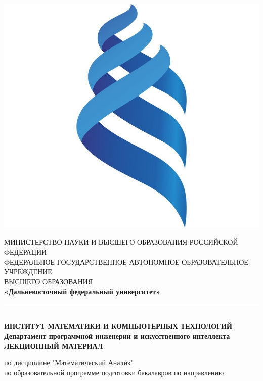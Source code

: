 \documentclass[12pt]{article}
\let\ORIincludegraphics\includegraphics
\renewcommand{\includegraphics}[2][]{\ORIincludegraphics[scale=0.65,#1]{#2}}
\begin{document}
    \justifying
    \begin{titlepage}
        \begin{center}
            \begin{center}
              \includegraphics[scale=0.1]{logo.jpg}
            \end{center}
            \normalsize{МИНИСТЕРСТВО НАУКИ И ВЫСШЕГО ОБРАЗОВАНИЯ РОССИЙСКОЙ ФЕДЕРАЦИИ}\\
            \footnotesize{ФЕДЕРАЛЬНОЕ ГОСУДАРСТВЕННОЕ АВТОНОМНОЕ ОБРАЗОВАТЕЛЬНОЕ УЧРЕЖДЕНИЕ}\\ 
            \footnotesize{ВЫСШЕГО ОБРАЗОВАНИЯ}\\
            \small{\textbf{«Дальневосточный федеральный университет»}}\\
            \noindent\rule{17cm}{0.4pt}\\
            \large{\textbf{ИНСТИТУТ МАТЕМАТИКИ И КОМПЬЮТЕРНЫХ ТЕХНОЛОГИЙ}}\\
             \hfill \break
            \large{\textbf{Департамент программной инженерии и искусственного интеллекта}}\\
            \hfill\break
            \hfill \break
            \hfill \break
            \hfill \break
            \large{\textbf{ЛЕКЦИОННЫЙ МАТЕРИАЛ}}\\
            \begin{center}
              \normalsize{по дисциплине "Математический Анализ"}\\
              \normalsize{по образовательной программе подготовки бакалавров по направлению}\\

\end{center}
\end{center}
\end{titlepage}
\end{document}
